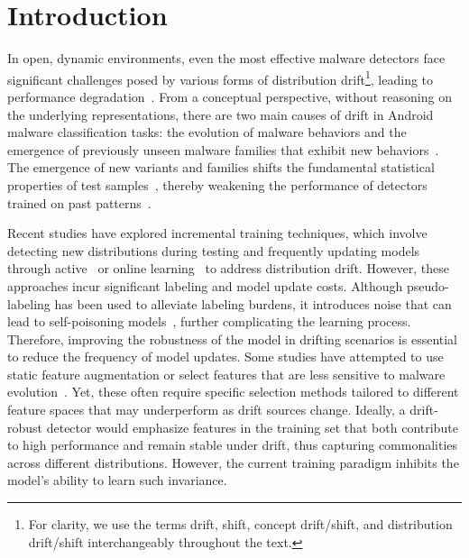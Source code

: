\section{Introduction}


In open, dynamic environments, even the most effective malware detectors face significant challenges posed by various forms of distribution drift{}\footnote{For clarity, we use the terms drift, shift, concept drift/shift, and distribution drift/shift interchangeably throughout the text.}, leading to performance degradation~\cite{transcending, cade}. From a conceptual perspective, without reasoning on the underlying representations, there are two main causes of drift in Android malware classification tasks: the evolution of malware behaviors and the emergence of previously unseen malware families that exhibit new behaviors~\cite{pei2024exploiting}. The emergence of new variants and families shifts the fundamental statistical properties of test samples~\cite{tesseract, overkill, transcending, Drift_forensice}, thereby weakening the performance of detectors trained on past patterns~\cite{malware_evolution_update}.


Recent studies have explored incremental training techniques, which involve detecting new distributions during testing and frequently updating models through active~\cite{tesseract, continuous} or online learning~\cite{droidevolver, online_mal, labelless} to address distribution drift. However, these approaches incur significant labeling and model update costs. Although pseudo-labeling has been used to alleviate labeling burdens, it introduces noise that can lead to self-poisoning models~\cite{labelless, recda}, further complicating the learning process. Therefore, improving the robustness of the model in drifting scenarios is essential to reduce the frequency of model updates. Some studies have attempted to use static feature augmentation or select features that are less sensitive to malware evolution~\cite{scrr, apigraph, overkill}. Yet, these often require specific selection methods tailored to different feature spaces that may underperform as drift sources change. Ideally, a drift-robust detector would emphasize features in the training set that both contribute to high performance and remain stable under drift, thus capturing commonalities across different distributions. However, the current training paradigm inhibits the model's ability to learn such invariance.

